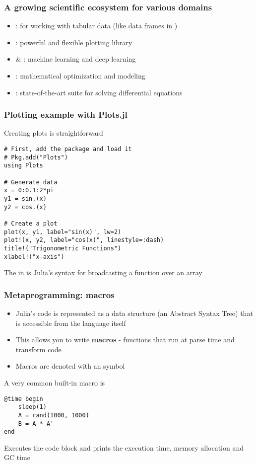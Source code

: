 \documentclass[aspectratio=169]{beamer}\usepackage[]{graphicx}\usepackage[]{xcolor}
\begin{document}
\begin{frame}
  \frametitle{A growing scientific ecosystem for various domains}
  \begin{itemize}
    \item {}: for working with tabular data (like data frames in )
    \vfill
    \item {}: powerful and flexible plotting library
    \vfill
    \item {} \& : machine learning and deep learning
    \vfill
    \item {}: mathematical optimization and modeling
    \vfill
    \item {}: state-of-the-art suite for solving differential equations
  \end{itemize}
\end{frame}

\begin{frame}[fragile]
  \frametitle{Plotting example with Plots.jl}
  Creating plots is straightforward
  \begin{lstlisting}
# First, add the package and load it
# Pkg.add("Plots")
using Plots

# Generate data
x = 0:0.1:2*pi
y1 = sin.(x)
y2 = cos.(x)

# Create a plot
plot(x, y1, label="sin(x)", lw=2)
plot!(x, y2, label="cos(x)", linestyle=:dash)
title!("Trigonometric Functions")
xlabel!("x-axis")\end{lstlisting}
The  in  is Julia's syntax for broadcasting a function over an array
\end{frame}

\begin{frame}[fragile]
  \frametitle{Metaprogramming: macros}
  \begin{itemize}
    \item Julia's code is represented as a data structure (an Abstract Syntax Tree) that is accessible from the language itself
    \item This allows you to write \textbf{macros} - functions that run at parse time and transform code
    \item Macros are denoted with an  symbol
  \end{itemize}
  \vfill
  A very common built-in macro is 
  \begin{lstlisting}
@time begin
    sleep(1)
    A = rand(1000, 1000)
    B = A * A'
end\end{lstlisting}
Executes the code block and prints the execution time, memory allocation and GC time
\end{frame}
\end{document}
